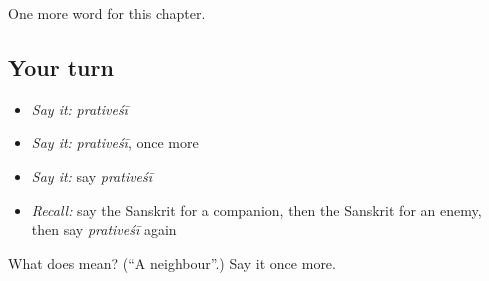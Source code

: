 \begin{grammarlens}[title={What you've built}]
One more word for this chapter.
\end{grammarlens}

\subsection*{Your turn}
\begin{itemize}
\raggedright
  \item \emph{Say it:} \emph{prativeśī}
  \item \emph{Say it:} \emph{prativeśī}, once more
  \item \emph{Say it:} say \emph{prativeśī}
  \item \emph{Recall:} say the Sanskrit for a companion, then the Sanskrit for an enemy, then say \emph{prativeśī} again
\end{itemize}

\begin{tcolorbox}[breakable,colback=teal!4,colframe=teal!35!black,title={Before you move on}]
What does  mean? (\textquotedblleft{}A neighbour\textquotedblright{}.) Say it once more.
\end{tcolorbox}
